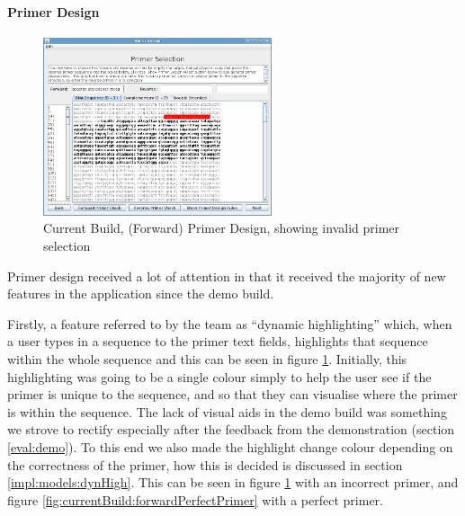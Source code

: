 \paragraph{Primer Design}

\begin{figure}[h]
  \begin{center}
    \includegraphics[width=0.6\textwidth]{./images/currentBuild/forwardPrimerDesignRed.png}
    \caption{
      \label{fig:currentBuild:forwardPrimerDesignRed}
      Current Build, (Forward) Primer Design, showing invalid primer selection
    }
  \end{center}
\end{figure}

Primer design received a lot of attention in that it received the
majority of new features in the application since the demo build.

Firstly, a feature referred to by the team as ``dynamic highlighting''
which, when a user types in a sequence to the primer text fields,
highlights that sequence within the whole sequence and this can be
seen in figure \ref{fig:currentBuild:forwardPrimerDesignRed}.
Initially, this highlighting was going to be a single colour simply to
help the user see if the primer is unique to the sequence, and so that
they can visualise where the primer is within the sequence.
The lack of visual aids in the demo build was something we strove to
rectify especially after the feedback from the demonstration (section
\ref{eval:demo}).
To this end we also made the highlight change colour depending on the
correctness of the primer, how this is decided is discussed in section
\ref{impl:models:dynHigh}.
This can be seen in figure
\ref{fig:currentBuild:forwardPrimerDesignRed} with an incorrect
primer, and figure \ref{fig:currentBuild:forwardPerfectPrimer} with a
perfect primer.

